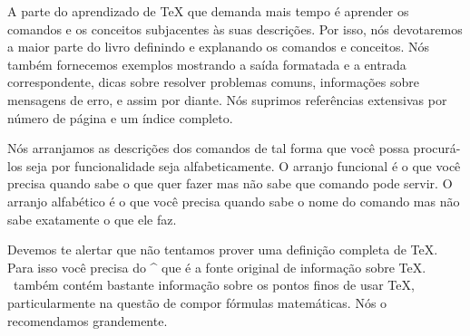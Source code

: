 A parte do aprendizado de \TeX{} que demanda mais tempo é aprender os comandos e
os conceitos subjacentes às suas descrições. Por isso, nós devotaremos a maior
parte do livro definindo e explanando os comandos e conceitos. Nós também
fornecemos exemplos mostrando a saída formatada e a entrada correspondente,
dicas sobre resolver problemas comuns, informações sobre mensagens de erro, e
assim por diante. Nós suprimos referências extensivas por número de página e um
índice completo.

Nós arranjamos as descrições dos comandos de tal forma que você possa
procurá-los seja por funcionalidade seja alfabeticamente. O arranjo funcional é
o que você precisa quando sabe o que quer fazer mas não sabe que comando pode
servir. O arranjo alfabético é o que você precisa quando sabe o nome do comando
mas não sabe exatamente o que ele faz.

Devemos te alertar que não tentamos prover uma definição completa de
\TeX{}. Para isso você precisa do ^{\texbook} que é a fonte original de
informação sobre \TeX{}. \texbook\ também contém bastante informação sobre os
pontos finos de usar \TeX{}, particularmente na questão de compor fórmulas
matemáticas. Nós o recomendamos grandemente.

